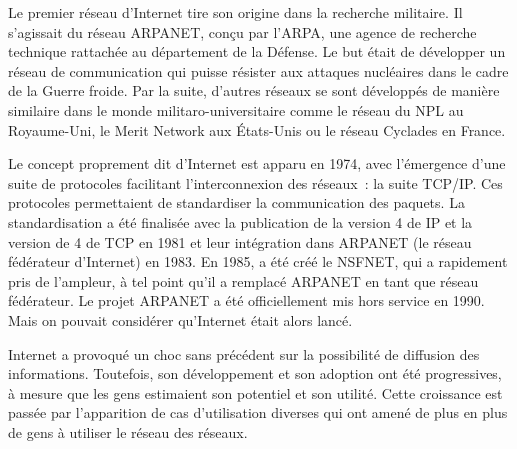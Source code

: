 Le premier réseau d'Internet tire son origine dans la recherche militaire. Il s'agissait du réseau ARPANET, conçu par l'ARPA, une agence de recherche technique rattachée au département de la Défense. Le but était de développer un réseau de communication qui puisse résister aux attaques nucléaires dans le cadre de la Guerre froide. Par la suite, d'autres réseaux se sont développés de manière similaire dans le monde militaro-universitaire comme le réseau du NPL au Royaume-Uni, le Merit Network aux États-Unis ou le réseau Cyclades en France.

Le concept proprement dit d'Internet est apparu en 1974, avec l'émergence d'une suite de protocoles facilitant l'interconnexion des réseaux~: la suite TCP/IP. Ces protocoles permettaient de standardiser la communication des paquets. La standardisation a été finalisée avec la publication de la version 4 de IP et la version de 4 de TCP en 1981 et leur intégration dans ARPANET (le réseau fédérateur d'Internet) en 1983. En 1985, a été créé le NSFNET, qui a rapidement pris de l'ampleur, à tel point qu'il a remplacé ARPANET en tant que réseau fédérateur. Le projet ARPANET a été officiellement mis hors service en 1990. Mais on pouvait considérer qu'Internet était alors lancé.


Internet a provoqué un choc sans précédent sur la possibilité de diffusion des informations. Toutefois, son développement et son adoption ont été progressives, à mesure que les gens estimaient son potentiel et son utilité. Cette croissance est passée par l'apparition de cas d'utilisation diverses qui ont amené de plus en plus de gens à utiliser le réseau des réseaux.

